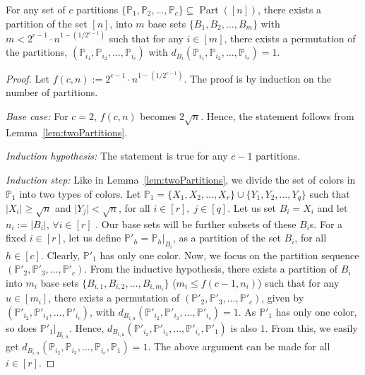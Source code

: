 \documentclass[final,oneeqnum, onethmnum, onefignum]{siamltex1213}
\renewcommand{\P}{\mathbb P}
\newcommand{\abs}[1]{\lvert #1 \rvert}
\DeclareMathOperator{\Part}{Part}
\begin{document}
\begin{lemma}
\label{lem:cPartitions}
For any set of $c$ partitions $\{ \P_1, \P_2, \dots, \P_c \} \subseteq \Part([n])$,
there exists a partition of the set $[n]$,
into $m$ base sets $\{B_1, B_2, \dots, B_{m} \}$
with $m < 2^{c-1} \cdot n^{1 - (1/2^{c-1})}$
such that for any $i \in [m]$,
there exists a permutation of the partitions, 
$(\P_{i_1} , \P_{i_2}, \dots, \P_{i_c})$
with $d_{B_i} (\P_{i_1} , \P_{i_2}, \dots, \P_{i_c}) = 1$.
\end{lemma}
\begin{proof}
Let $f(c, n) := 2^{c-1} \cdot n^{1 - (1/2^{c-1})} $.
The proof is by induction on the number of partitions. 

{\em Base case:} For $c = 2$, $f(c,n)$ becomes 
$2 \sqrt{n}$. Hence, the statement follows from Lemma~\ref{lem:twoPartitions}.

{\em Induction hypothesis:} The statement is true for any $c-1$ partitions. 
 
{\em Induction step:} Like in Lemma~\ref{lem:twoPartitions}, we divide the 
set of colors in $\P_1$ into two types of colors. 
Let $\P_1 = \{X_1, X_2, \dots, X_{r} \} \cup \{ Y_1, Y_2, \dots, Y_{q}\}$
such that $\abs{X_i} \geq \sqrt{n}$ and $\abs{Y_j} < \sqrt{n}$,
 for all $i \in [r], \; j \in [q]$.
Let us set $B_i = X_i$ and let $n_i := \abs{B_i}$, $\forall i \in [r]$ . 
Our base sets will be further subsets of these $B_i$s. 
For a fixed $i \in [r]$, let us define $\P'_h = \P_h|_{B_i} $, as a partition of the set $B_i$,
for all $h \in [c]$.
Clearly, $\P'_1$ has only one color. 
Now, we focus on the partition sequence $(\P'_2, \P'_3, \dots, \P'_c)$.
From the inductive hypothesis, 
there exists a partition of $B_i$ into $m_i$ base sets
$\{ B_{i,1}, B_{i,2}, \dots, B_{i,m_i} \}$ ($m_i \leq f(c-1, n_i)$) such that 
for any $u \in [m_i]$, there exists a permutation of 
$(\P'_2, \P'_3, \dots, \P'_c)$, given by $(\P'_{i_2}, \P'_{i_3}, \dots, \P'_{i_c})$,  
with $d_{B_{i,u}} (\P'_{i_2}, \P'_{i_3}, \dots, \P'_{i_c}) = 1$.
As $\P'_1$ has only one color, so does $\P'_1|_{B_{i,u}}$. 
Hence, $d_{B_{i,u}} (\P'_{i_2}, \P'_{i_3}, \dots, \P'_{i_c}, \P'_1)$ is also $1$.
From this, we easily get $d_{B_{i,u}} (\P_{i_2}, \P_{i_3}, \dots, \P_{i_c}, \P_1) = 1$.
The above argument can be made for all $i \in [r]$.


\end{proof}
\end{document}
